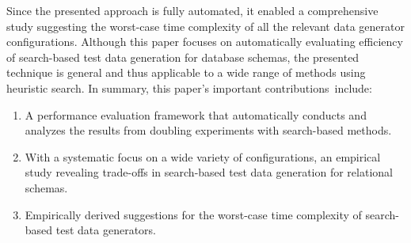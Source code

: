 Since the presented approach is fully automated, it enabled a comprehensive study suggesting the worst-case time
complexity of all the relevant data generator configurations. Although this paper focuses on automatically evaluating
efficiency of search-based test data generation for database schemas, the presented technique is general and thus
applicable to a wide range of methods using heuristic search. In summary, this paper's important \mbox{contributions
include}:



\begin{enumerate}
  \itemsep0in

  \item A performance evaluation framework that automatically conducts and analyzes the results from doubling
    experiments with search-based methods.

  \item With a systematic focus on a wide variety of configurations, an empirical study revealing trade-offs
    in search-based test data generation for relational schemas.

  \item Empirically derived suggestions for the worst-case time complexity of search-based test data generators.

  \end{enumerate}
  \vspace*{-.2in}
